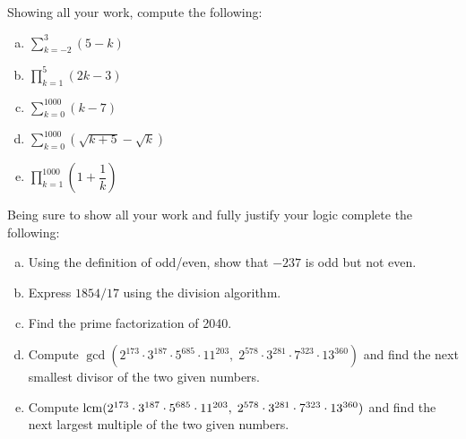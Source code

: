 \documentclass[12pt,letterpaper]{exam}
\begin{document}
\begin{questions}
\sol {\itshape
\begin{enumerate}[(a)]
\item 
\item 
\item 
\item 
\end{enumerate}
}



\newpage
\question[10] Showing all your work, compute the following:
	\begin{enumerate}[(a)]
	\item $\displaystyle \sum_{k= -2}^3 (5 - k)$
	\item $\displaystyle \prod_{k=1}^5 (2k -3)$ 
	\item $\displaystyle \sum_{k=0}^{1000} (k - 7)$
	\item $\displaystyle \sum_{k=0}^{1000} \left( \sqrt{k + 5} - \sqrt{k} \right)$
	\item $\displaystyle \prod_{k=1}^{1000} \left(1 + \dfrac{1}{k} \right)$
	\end{enumerate} \pspace

\sol {\itshape
\begin{enumerate}[(a)]
\item 
\item 
\item 
\item 
\item 
\end{enumerate}
}



\newpage
\question[10] Being sure to show all your work and fully justify your logic complete the following:
	\begin{enumerate}[(a)]
	\item Using the definition of odd/even, show that $-237$ is odd but not even.
	\item Express $1854/17$ using the division algorithm. 
	\item Find the prime factorization of 2040. 
	\item Compute $\gcd(2^{173} \cdot 3^{187} \cdot 5^{685} \cdot 11^{203}, \; 2^{578} \cdot 3^{281} \cdot 7^{323} \cdot 13^{360})$ and find the next smallest divisor of the two given numbers. 
	\item Compute $\operatorname{lcm}(2^{173} \cdot 3^{187} \cdot 5^{685} \cdot 11^{203}, \; 2^{578} \cdot 3^{281} \cdot 7^{323} \cdot 13^{360})$ and find the next largest multiple of the two given numbers.
	\end{enumerate} \pspace


\end{questions}
\end{document}
